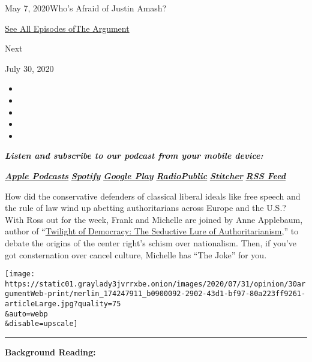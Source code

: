 May 7, 2020Who's Afraid of Justin Amash?

\href{https://www.nytimes3xbfgragh.onion/column/the-argument}{See All
Episodes ofThe Argument}

Next

July 30, 2020

\begin{itemize}
\item
\item
\item
\item
\item
\end{itemize}

\emph{\textbf{Listen and subscribe to our podcast from your mobile
device:}}

\textbf{\href{https://itunes.apple.com/us/podcast/the-argument/id1438024613?mt=2}{\emph{Apple
Podcasts}}} \emph{\textbf{\textbar{}}}
\textbf{\href{https://open.spotify.com/show/6bmhSFLKtApYClEuSH8q42}{\emph{Spotify}}}
\emph{\textbf{\textbar{}}}
\textbf{\href{https://play.google.com/music/m/Idxib4hsg3yviao4gtym76knjjy?t=The_Argument}{\emph{Google
Play}}} \emph{\textbf{\textbar{}}}
\textbf{\href{https://radiopublic.com/the-argument-Wdbepr}{\emph{RadioPublic}}}
\emph{\textbf{\textbar{}}}
\textbf{\href{https://www.stitcher.com/podcast/the-new-york-times/the-argument}{\emph{Stitcher}}}
\emph{\textbf{\textbar{}}}
\textbf{\href{https://rss.art19.com/the-argument}{\emph{RSS Feed}}}

How did the conservative defenders of classical liberal ideals like free
speech and the rule of law wind up abetting authoritarians across Europe
and the U.S.? With Ross out for the week, Frank and Michelle are joined
by Anne Applebaum, author of
``\href{https://www.penguinrandomhouse.com/books/621076/twilight-of-democracy-by-anne-applebaum/}{Twilight
of Democracy: The Seductive Lure of Authoritarianism},'' to debate the
origins of the center right's schism over nationalism. Then, if you've
got consternation over cancel culture, Michelle has ``The Joke'' for
you.

\texttt{[image: https://static01.graylady3jvrrxbe.onion/images/2020/07/31/opinion/30argumentWeb-print/merlin\_174247911\_b0900092-2902-43d1-bf97-80a223ff9261-articleLarge.jpg?quality=75\\\&auto=webp\\\&disable=upscale]}

\begin{center}\rule{0.5\linewidth}{\linethickness}\end{center}

\textbf{Background Reading:}

